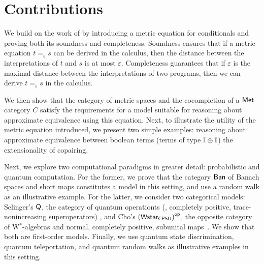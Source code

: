 





\section{Contributions}
We build on the work of \cite{dahlqvist2023syntactic} by introducing a metric equation for conditionals and proving both its soundness and completeness. Soundness ensures that if a metric equation $t =_{\varepsilon} s$ can be derived in the calculus, then the distance between the interpretations of $t$ and $s$ is at most $\varepsilon$. Completeness guarantees that if $\varepsilon$ is the maximal distance between the interpretations of two programs, then we can derive $t =_{\varepsilon} s$ in the calculus. 

We then show that the category of metric spaces and the cocompletion of a $ \mathsf{Met} $-category $ C $ satisfy the requirements for a model suitable for reasoning about approximate equivalence using this equation.  Next, to illustrate the utility of the metric equation introduced, we present two simple examples: reasoning about approximate equivalence between boolean terms (\ie terms of type $ \mathbb{I} \oplus \mathbb{I} $) the extensionality of copairing.


Next, we explore two computational paradigms in greater detail: probabilistic and quantum computation. For the former, we prove that the category $ \mathsf{Ban} $ of Banach spaces and short maps constitutes a model in this setting, and use a random walk as an illustrative example. For the latter, we consider two categorical models: Selinger’s \( \mathsf{Q} \), the category of quantum operationts (\ie, completely positive, trace-nonincreasing superoperators) \cite{selinger2004towards}, and Cho’s \( \left(\mathsf{Wstar_{CPSU}}\right)^{\mathsf{op}} \), the opposite category of W$^*$-algebras and normal, completely positive, subunital maps~\cite{choSemanticsQuantumProgramming2016}. We show that both are first-order models. Finally, we use quantum state discrimination, quantum teleportation, and quantum random walks as illustrative examples in this setting.


